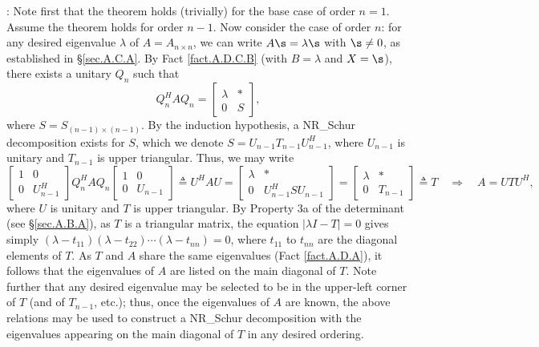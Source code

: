\/: Note first that the theorem holds
(trivially) for the base case of order $n=1$.  Assume the theorem
holds for order $n-1$.  Now consider the case of order $n$: for any
desired eigenvalue $\lambda$ of $A=A_{n\times n}$, we can write
$A\s=\lambda \s$ with $\s\ne 0$, as established in \S \ref{sec.A.C.A}.
By Fact \ref{fact.A.D.C.B} (with $B=\lambda$ and $X=\s$), there exists
a unitary $Q_{n}$ such that
\begin{equation*}
Q_{n}^{H} A Q_{n} =\begin{bmatrix} \lambda & * \\ 0 & S \end{bmatrix},
\end{equation*}
where $S=S_{(n-1)\times (n-1)}$.  By the induction hypothesis, a NR_Schur
decomposition exists for $S$, which we denote $S=U_{n-1} T_{n-1}
U^{H}_{n-1}$, where $U_{n-1}$ is unitary and $T_{n-1}$ is upper
triangular.  Thus, we may write
\begin{equation*}
    \begin{bmatrix} 1 & 0 \\ 0 & U^{H}_{n-1} \end{bmatrix} Q_{n}^{H} A Q_{n}
		\begin{bmatrix} 1 & 0 \\ 0 & U_{n-1}     \end{bmatrix} \triangleq U^{H} A U =
		\begin{bmatrix} \lambda & * \\ 0 & U^{H}_{n-1} S U_{n-1} \end{bmatrix} =
		\begin{bmatrix} \lambda & * \\ 0 & T_{n-1} \end{bmatrix} \triangleq
		    T \quad \Rightarrow \quad A = U T U^{H},
\end{equation*}
where $U$ is unitary and $T$ is upper triangular.  By Property 3a of
the determinant (see \S \ref{sec.A.B.A}), as $T$ is a triangular
matrix, the equation $|\lambda I-T|=0$ gives simply
$(\lambda-t_{11})(\lambda-t_{22})\cdots(\lambda-t_{nn})=0$, where
$t_{11}$ to $t_{nn}$ are the diagonal elements of $T$.  As $T$ and $A$
share the same eigenvalues (Fact \ref{fact.A.D.A}), it follows that
the eigenvalues of $A$ are listed on the main diagonal of $T$.  Note
further that any desired eigenvalue may be selected to be in the
upper-left corner of $T$ (and of $T_{n-1}$, etc.); thus, once the
eigenvalues of $A$ are known, the above relations may be used to
construct a NR_Schur decomposition with the eigenvalues appearing on the
main diagonal of $T$ in any desired ordering.   \endproof \vskip0.1in

